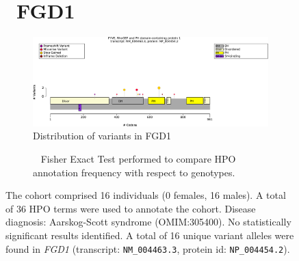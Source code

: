 \begin{figure}[htbp]
\section*{ FGD1}
\centering
\begin{subfigure}[b]{0.95\textwidth}
\centering
\includegraphics[width=\textwidth]{ img/FGD1_protein_diagram.pdf} 
\captionsetup{justification=raggedright,singlelinecheck=false}
\caption{Distribution of variants in FGD1}
\end{subfigure}

\vspace{2em}

\begin{subfigure}[b]{0.95\textwidth}
\centering
{}
\captionsetup{justification=raggedright,singlelinecheck=false}
\caption{             Fisher Exact Test performed to compare HPO annotation frequency with respect to genotypes. }
\end{subfigure}

\vspace{2em}

\caption{ The cohort comprised 16 individuals (0 females, 16 males). A total of 36 HPO terms were used to annotate the cohort. Disease diagnosis: Aarskog-Scott syndrome (OMIM:305400). No statistically significant results identified. A total of 16 unique variant alleles were found in \textit{FGD1} (transcript: \texttt{NM\_004463.3}, protein id: \texttt{NP\_004454.2}).}
\end{figure}
